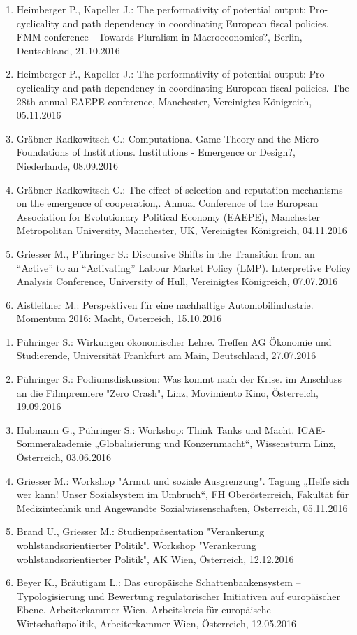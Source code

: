\begin{enumerate}
	\item Heimberger P., Kapeller J.: The performativity of potential output: Pro-cyclicality and path dependency in coordinating European fiscal policies. FMM conference - Towards Pluralism in Macroeconomics?, Berlin, Deutschland, 21.10.2016
	\item Heimberger P., Kapeller J.: The performativity of potential output: Pro-cyclicality and path dependency in coordinating European fiscal policies. The 28th annual EAEPE conference, Manchester, Vereinigtes Königreich, 05.11.2016
	\item Gräbner-Radkowitsch C.: Computational Game Theory and the Micro Foundations of Institutions. Institutions - Emergence or Design?, Niederlande, 08.09.2016
	\item Gräbner-Radkowitsch C.: The effect of selection and reputation mechanisms on the emergence of cooperation,. Annual Conference of the European Association for Evolutionary Political Economy (EAEPE), Manchester Metropolitan University, Manchester, UK, Vereinigtes Königreich, 04.11.2016
	\item Griesser M., Pühringer S.: Discursive Shifts in the Transition from an “Active” to an “Activating” Labour Market Policy (LMP). Interpretive Policy Analysis Conference, University of Hull, Vereinigtes Königreich, 07.07.2016
	\item Aistleitner M.: Perspektiven für eine nachhaltige Automobilindustrie. Momentum 2016: Macht, Österreich, 15.10.2016
\end{enumerate}

\begin{enumerate}
	\item Pühringer S.: Wirkungen ökonomischer Lehre. Treffen AG Ökonomie und Studierende, Universität Frankfurt am Main, Deutschland, 27.07.2016
	\item Pühringer S.: Podiumsdiskussion: Was kommt nach der Krise. im Anschluss an die Filmpremiere "Zero Crash", Linz, Movimiento Kino, Österreich, 19.09.2016
	\item Hubmann G., Pühringer S.: Workshop: Think Tanks und Macht. ICAE-Sommerakademie „Globalisierung und Konzernmacht“, Wissensturm Linz, Österreich, 03.06.2016
	\item Griesser M.: Workshop "Armut und soziale Ausgrenzung". Tagung „Helfe sich wer kann! Unser Sozialsystem im Umbruch“, FH Oberösterreich, Fakultät für Medizintechnik und Angewandte Sozialwissenschaften, Österreich, 05.11.2016
	\item Brand U., Griesser M.: Studienpräsentation "Verankerung wohlstandsorientierter Politik". Workshop "Verankerung wohlstandsorientierter Politik", AK Wien, Österreich, 12.12.2016
	\item Beyer K., Bräutigam L.: Das europäische Schattenbankensystem – Typologisierung und Bewertung regulatorischer Initiativen auf europäischer Ebene. Arbeiterkammer Wien, Arbeitskreis für europäische Wirtschaftspolitik, Arbeiterkammer Wien, Österreich, 12.05.2016
\end{enumerate}

